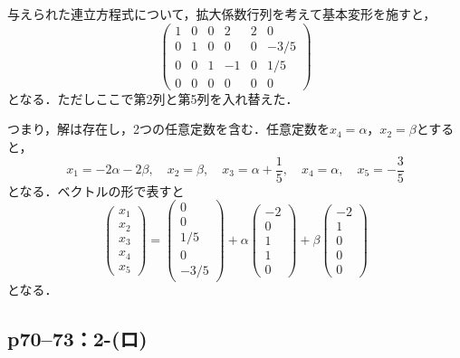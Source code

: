 \documentclass[a4paper,10pt,fleqn]{ltjsarticle}
\begin{document}
\begin{tleftbar}
  与えられた連立方程式について，拡大係数行列を考えて基本変形を施すと，
  \[
    \begin{pmatrix} 1 & 0 & 0 & 2 & 2 & 0 \\ 0 & 1& 0 & 0 & 0 & -3/5 \\ 0 & 0 & 1 & -1 & 0 & 1/5 \\ 0 & 0 & 0 & 0 & 0 & 0 \end{pmatrix}
  \]
  となる．ただしここで第2列と第5列を入れ替えた．

  つまり，解は存在し，2つの任意定数を含む．任意定数を$x_4 = \alpha$，$x_2 = \beta $とすると，
  \[
    x_1 = -2 \alpha - 2 \beta , \quad x_2 =\beta , \quad x_3 = \alpha + \frac{1}{5} , \quad x_4 = \alpha , \quad x_5 = -\frac{3}{5}
  \]
  となる．ベクトルの形で表すと
  \[
    \begin{pmatrix} x_1 \\ x_2 \\ x_3 \\ x_4 \\ x_5 \end{pmatrix}= \begin{pmatrix} 0 \\ 0 \\ 1/5 \\ 0 \\ -3/5 \end{pmatrix} + \alpha \begin{pmatrix} -2 \\ 0 \\ 1 \\ 1 \\ 0 \end{pmatrix} + \beta \begin{pmatrix} -2 \\ 1 \\ 0 \\ 0 \\ 0 \end{pmatrix}
  \]
  となる．
\end{tleftbar}

\subsection*{p70--73：2-(ロ)}
\end{document}
